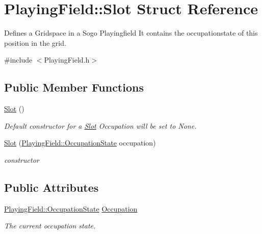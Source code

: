 \hypertarget{structPlayingField_1_1Slot}{\section{Playing\-Field\-:\-:Slot Struct Reference}
\label{structPlayingField_1_1Slot}
}


Defines a Gridspace in a Sogo Playingfield It contains the occupationstate of this position in the grid.  




{\ttfamily \#include $<$Playing\-Field.\-h$>$}

\subsection*{Public Member Functions}
\begin{DoxyCompactItemize}
\item 
\hypertarget{structPlayingField_1_1Slot_a2c572050c538c2d445597984a14df2a6}{\hyperlink{structPlayingField_1_1Slot_a2c572050c538c2d445597984a14df2a6}{Slot} ()}\label{structPlayingField_1_1Slot_a2c572050c538c2d445597984a14df2a6}

\begin{DoxyCompactList}\small\item\em Default constructor for a \hyperlink{structPlayingField_1_1Slot}{Slot} Occupation will be set to None. \end{DoxyCompactList}\item 
\hyperlink{structPlayingField_1_1Slot_ad56b4d9838d1475763c131bf310ae2d0}{Slot} (\hyperlink{classPlayingField_ac6df152a3f820aa04a00ab4df4a9d265}{Playing\-Field\-::\-Occupation\-State} occupation)
\begin{DoxyCompactList}\small\item\em constructor \end{DoxyCompactList}\end{DoxyCompactItemize}
\subsection*{Public Attributes}
\begin{DoxyCompactItemize}
\item 
\hypertarget{structPlayingField_1_1Slot_a1c4ada065c877c9dd33950a9f9eb7d4f}{\hyperlink{classPlayingField_ac6df152a3f820aa04a00ab4df4a9d265}{Playing\-Field\-::\-Occupation\-State} \hyperlink{structPlayingField_1_1Slot_a1c4ada065c877c9dd33950a9f9eb7d4f}{Occupation}}\label{structPlayingField_1_1Slot_a1c4ada065c877c9dd33950a9f9eb7d4f}

\begin{DoxyCompactList}\small\item\em The current occupation state. \end{DoxyCompactList}\end{DoxyCompactItemize}



